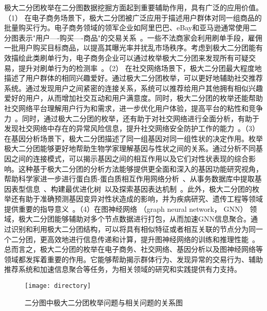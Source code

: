 极大二分团枚举在二分图数据挖掘方面起到重要辅助作用，具有广泛的应用价值。（1） 在电子商务场景下，极大二分团被广泛应用于描述用户群体对同一组商品的批量购买行为。电子商务领域的领军企业如阿里巴巴、eBay和亚马逊通常使用二分图表示"用户----购买----商品"的交易关系~\cite{MEB20}。一些不法商家会利用刷单手段，雇佣一批用户购买目标商品，以提高其曝光率并扰乱市场秩序。考虑到极大二分团能有效描绘此类刷单行为，电子商务企业可以通过枚举极大二分团来发现所有可疑交易，提升对刷单行为的检测率~\cite{clickfarm21,MEB20,MEB22,skylinechinese23}。（2） 在社交网络场景下，极大二分团最大程度地描述了用户群体的相同兴趣爱好。通过极大二分团枚举，可以更好地辅助社交推荐系统。通过发现用户之间紧密的连接关系，系统可以推荐给用户其他拥有相似兴趣爱好的用户，从而增加社交互动和用户满意度。同时，极大二分团的枚举还能帮助社交网络平台理解用户行为和需求，进一步优化用户体验，提高平台的粘性和竞争力~\cite{minel06,MBEchinese17}。同时，通过极大二分团的枚举，还有助于对社交网络进行全面分析，有助于发现社交网络中存在的异常风险信息，提升社交网络安全防护工作的能力~\cite{dangerous19,dangerous05}。（3） 在基因分析场景下，极大二分团描述了同一组基因对同一组性状的决定作用。枚举极大二分团能够更好地帮助生物学家理解基因与性状之间的关系。通过分析不同基因之间的连接模式，可以揭示基因之间的相互作用以及它们对性状表现的综合影响。这种基于极大二分团的分析方法能够提供更全面和深入的基因功能研究视角，帮助科学家进一步进行蛋白质-蛋白质相互作用网络分析~\cite{protein11}、从事务数据库中提取基因表型信息~\cite{gene11}、构建最优进化树~\cite{tree04}以及探索基因表达机制~\cite{geneexp11}。此外，极大二分团的枚举还有助于准确预测基因变异对性状造成的影响，并为疾病研究、遗传工程等领域提供重要的指导意义~\cite{gene22,iMBEA14,protein21}。（4）在图神经网络 （graph neural network， GNN） 领域，极大二分团能够辅助对多个节点数据进行打包，从而加速GNN信息聚合。通过识别和利用极大二分团结构，可以将具有相似特征或者相互关联的节点分为同一个二分团，更高效地进行信息传递和计算，提升图神经网络的训练和推理性能~\cite{Pqbiclique21,Pqbiclique23,Pq23}。总而言之，极大二分团的枚举在电子商务、社交网络、基因分析以及图神经网络等领域都发挥着重要的作用。它能够帮助揭示群体行为、发现异常的交易行为、辅助推荐系统和加速信息聚合等任务，为相关领域的研究和实践提供有力支持。

\begin{figure} [t]
  \centering
  \vspace{0.1in}
  \texttt{[image: directory]}
  \vspace{0.2in}
  \caption{二分图中极大二分团枚举问题与相关问题的关系图}
  \label{fig:directory}
\end{figure}

